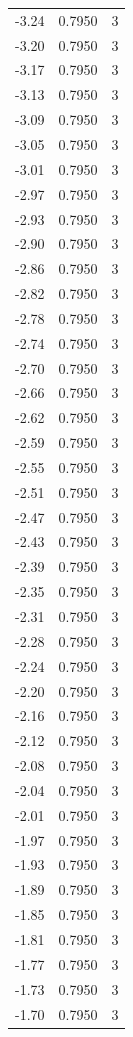 \begin{longtable}{lrr}
  -3.24 & 0.7950 & 3 \\
  -3.20 & 0.7950 & 3 \\
  -3.17 & 0.7950 & 3 \\
  -3.13 & 0.7950 & 3 \\
  -3.09 & 0.7950 & 3 \\
  -3.05 & 0.7950 & 3 \\
  -3.01 & 0.7950 & 3 \\
  -2.97 & 0.7950 & 3 \\
  -2.93 & 0.7950 & 3 \\
  -2.90 & 0.7950 & 3 \\
  -2.86 & 0.7950 & 3 \\
  -2.82 & 0.7950 & 3 \\
  -2.78 & 0.7950 & 3 \\
  -2.74 & 0.7950 & 3 \\
  -2.70 & 0.7950 & 3 \\
  -2.66 & 0.7950 & 3 \\
  -2.62 & 0.7950 & 3 \\
  -2.59 & 0.7950 & 3 \\
  -2.55 & 0.7950 & 3 \\
  -2.51 & 0.7950 & 3 \\
  -2.47 & 0.7950 & 3 \\
  -2.43 & 0.7950 & 3 \\
  -2.39 & 0.7950 & 3 \\
  -2.35 & 0.7950 & 3 \\
  -2.31 & 0.7950 & 3 \\
  -2.28 & 0.7950 & 3 \\
  -2.24 & 0.7950 & 3 \\
  -2.20 & 0.7950 & 3 \\
  -2.16 & 0.7950 & 3 \\
  -2.12 & 0.7950 & 3 \\
  -2.08 & 0.7950 & 3 \\
  -2.04 & 0.7950 & 3 \\
  -2.01 & 0.7950 & 3 \\
  -1.97 & 0.7950 & 3 \\
  -1.93 & 0.7950 & 3 \\
  -1.89 & 0.7950 & 3 \\
  -1.85 & 0.7950 & 3 \\
  -1.81 & 0.7950 & 3 \\
  -1.77 & 0.7950 & 3 \\
  -1.73 & 0.7950 & 3 \\
  -1.70 & 0.7950 & 3 \\

\end{longtable}

